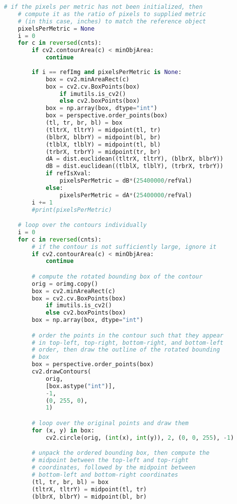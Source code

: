 \begin{lstlisting}[language=Python, caption=Image Analysis Source Code, label=lis:imageAnalysisSourceCode]
    # if the pixels per metric has not been initialized, then
    # compute it as the ratio of pixels to supplied metric
    # (in this case, inches) to match the reference object
    pixelsPerMetric = None
    i = 0
    for c in reversed(cnts):
        if cv2.contourArea(c) < minObjArea:
            continue
            
        if i == refImg and pixelsPerMetric is None:
            box = cv2.minAreaRect(c)
            box = cv2.cv.BoxPoints(box)
                if imutils.is_cv2()
                else cv2.boxPoints(box)
            box = np.array(box, dtype="int")
            box = perspective.order_points(box)
            (tl, tr, br, bl) = box
            (tltrX, tltrY) = midpoint(tl, tr)
            (blbrX, blbrY) = midpoint(bl, br)
            (tlblX, tlblY) = midpoint(tl, bl)
            (trbrX, trbrY) = midpoint(tr, br)
            dA = dist.euclidean((tltrX, tltrY), (blbrX, blbrY))
            dB = dist.euclidean((tlblX, tlblY), (trbrX, trbrY))
            if refIsXval:
                pixelsPerMetric = dB*(25400000/refVal)
            else:
                pixelsPerMetric = dA*(25400000/refVal)
        i += 1
        #print(pixelsPerMetric)

    # loop over the contours individually
    i = 0
    for c in reversed(cnts):
        # if the contour is not sufficiently large, ignore it
        if cv2.contourArea(c) < minObjArea:
            continue

        # compute the rotated bounding box of the contour
        orig = orimg.copy()
        box = cv2.minAreaRect(c)        
        box = cv2.cv.BoxPoints(box)
            if imutils.is_cv2()
            else cv2.boxPoints(box)
        box = np.array(box, dtype="int")

        # order the points in the contour such that they appear
        # in top-left, top-right, bottom-right, and bottom-left
        # order, then draw the outline of the rotated bounding
        # box
        box = perspective.order_points(box)
        cv2.drawContours(
            orig,
            [box.astype("int")],
            -1,
            (0, 255, 0),
            1)

        # loop over the original points and draw them
        for (x, y) in box:
            cv2.circle(orig, (int(x), int(y)), 2, (0, 0, 255), -1)

        # unpack the ordered bounding box, then compute the
        # midpoint between the top-left and top-right 
        # coordinates, followed by the midpoint between
        # bottom-left and bottom-right coordinates
        (tl, tr, br, bl) = box
        (tltrX, tltrY) = midpoint(tl, tr)
        (blbrX, blbrY) = midpoint(bl, br)


\end{lstlisting}
